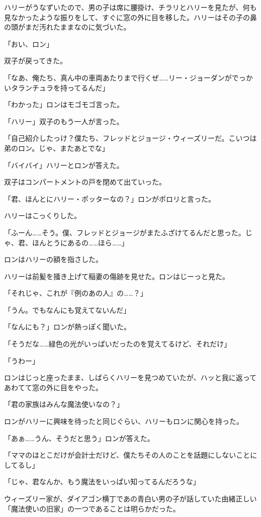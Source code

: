 \documentclass[10pt,a4paper]{article}
\begin{document}
\begin{CJK}{UTF8}{min}
ハリーがうなずいたので、男の子は席に腰掛け、チラリとハリーを見たが、何も見なかったような振りをして、すぐに窓の外に目を移した。ハリーはその子の鼻の頭がまだ汚れたままなのに気づいた。

「おい、ロン」

双子が戻ってきた。

「なあ、俺たち、真ん中の車両あたりまで行くぜ……リー・ジョーダンがでっかいタランチュラを持ってるんだ」

「わかった」ロンはモゴモゴ言った。

「ハリー」双子のもう一人が言った。

「自己紹介したっけ？僕たち、フレッドとジョージ・ウィーズリーだ。こいつは弟のロン。じゃ、またあとでな」

「バイバイ」ハリーとロンが答えた。

双子はコンパートメントの戸を閉めて出ていった。

「君、ほんとにハリー・ポッターなの？」ロンがポロリと言った。

ハリーはこっくりした。

「ふーん……そう。僕、フレッドとジョージがまたふざけてるんだと思った。じゃ、君、ほんとうにあるの……ほら……」

ロンはハリーの額を指さした。

ハリーは前髪を掻き上げて稲妻の傷跡を見せた。ロンはじーっと見た。

「それじゃ、これが『例のあの人』の……？」

「うん。でもなんにも覚えてないんだ」

「なんにも？」ロンが熱っぽく聞いた。

「そうだな……緑色の光がいっぱいだったのを覚えてるけど、それだけ」

「うわー」

ロンはじっと座ったまま、しばらくハリーを見つめていたが、ハッと我に返ってあわてて窓の外に目をやった。

「君の家族はみんな魔法使いなの？」

ロンがハリーに興味を待ったと同じぐらい、ハリーもロンに関心を持った。

「あぁ……うん、そうだと思う」ロンが答えた。

「ママのはとこだけが会計士だけど、僕たちその人のことを話題にしないことにしてるし」

「じゃ、君なんか、もう魔法をいっぱい知ってるんだろうな」

ウィーズリー家が、ダイアゴン横丁であの青白い男の子が話していた由緒正しい「魔法使いの旧家」の一つであることは明らかだった。


\end{CJK}
\end{document}
